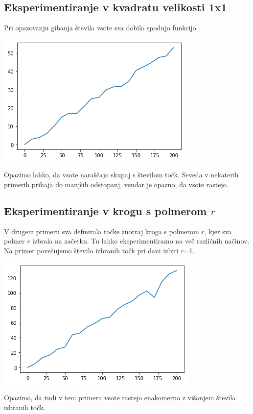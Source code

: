 \documentclass[12pt, a4paper]{article}
\begin{document}
\subsection{Eksperimentiranje v kvadratu velikosti 1x1}
Pri opazovanju gibanja števila vsote sva dobila spodnjo funkcijo.\\
\begin{center}
\includegraphics{kvadrat_1x1.png}
\end{center}
Opazimo lahko, da vsote naraščajo skupaj s številom točk. Seveda v nekaterih primerih prihaja do manjših odstopanj, vendar je opazno, da vsote rastejo.

\subsection{Eksperimentiranje v krogu s polmerom $r$}
V drugem primeru sva definirala točke znotraj kroga s polmerom $r$, kjer sva polmer $r$ izbrala na začetku. Tu lahko eksperimentiramo na več različnih načinov.
Na primer povečujemo število izbranih točk pri dani izbiri $r$=1.
\begin{center}
\includegraphics{krog_s_danim_polmerom.png}
\end{center}
Opazimo, da tudi v tem primeru vsote rastejo enakomerno z višanjem števila izbranih točk.
	
\end{document}
